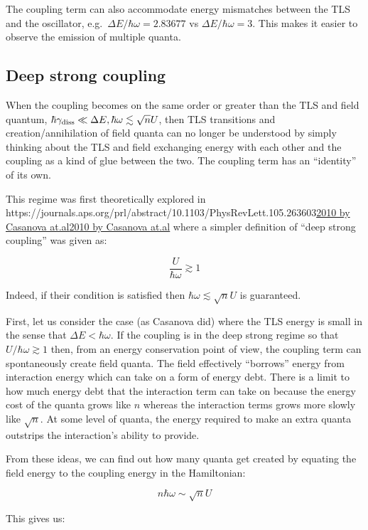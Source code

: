 \documentclass[
]{article}
\let\oldhref\href
\renewcommand{\href}[2]{\ifx#1\urlprefix\oldhref{#1}{#2}\else\uline{\oldhref{#1}{#2}}\fi}
\renewcommand{\[}{\begin{equation}}
\renewcommand{\]}{\end{equation}}
\begin{document}
The coupling term can also accommodate energy mismatches between the TLS
and the oscillator, e.g.~\(\Delta E/ \hbar\omega = 2.83677\) vs
\(\Delta E/ \hbar\omega = 3\). This makes it easier to observe the
emission of multiple quanta.

\subsection{Deep strong coupling}\label{deep-strong-coupling-1}

When the coupling becomes on the same order or greater than the TLS and
field quantum,
\(\hbar\gamma_{\rm diss} \ll \Delta E , \hbar \omega \lesssim \sqrt{n}U\),
then TLS transitions and creation/annihilation of field quanta can no
longer be understood by simply thinking about the TLS and field
exchanging energy with each other and the coupling as a kind of glue
between the two. The coupling term has an ``identity'' of its own.

This regime was first theoretically explored in
\href{https://journals.aps.org/prl/abstract/10.1103/PhysRevLett.105.263603}{2010
by Casanova at.al} where a simpler definition of ``deep strong
coupling'' was given as:

\[
\frac{U}{\hbar\omega} \gtrsim 1
\label{eq:deepstrongcoupling}
\]

Indeed, if their condition is satisfied then
\(\hbar \omega \lesssim \sqrt{n}U\) is guaranteed.

First, let us consider the case (as Casanova did) where the TLS energy
is small in the sense that \(\Delta E < \hbar \omega\). If the coupling
is in the deep strong regime so that \(U/\hbar\omega \gtrsim 1\) then,
from an energy conservation point of view, the coupling term can
spontaneously create field quanta. The field effectively ``borrows''
energy from interaction energy which can take on a form of energy debt.
There is a limit to how much energy debt that the interaction term can
take on because the energy cost of the quanta grows like \(n\) whereas
the interaction terms grows more slowly like \(\sqrt{n}\). At some level
of quanta, the energy required to make an extra quanta outstrips the
interaction's ability to provide.

From these ideas, we can find out how many quanta get created by
equating the field energy to the coupling energy in the Hamiltonian:

\[
n\hbar\omega \sim \sqrt{n}U
\label{eq:couplingbalancefield}
\]

This gives us:
\end{document}
